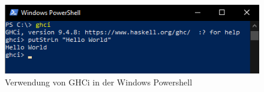 \begin{figure}[H]
    \centering
    \includegraphics[width=1\linewidth]{Figures/Anhang/ghci}
    \caption{Verwendung von GHCi in der Windows Powershell}
\end{figure}